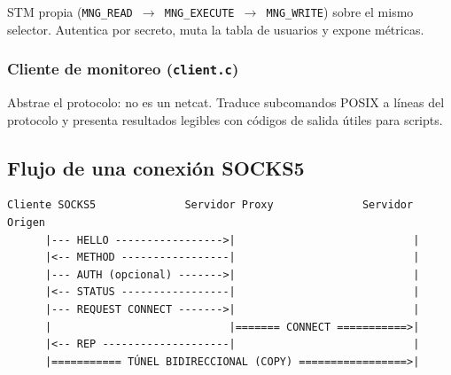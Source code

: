 \documentclass[12pt,a4paper]{article}
\begin{document}
STM propia (\texttt{MNG\_READ $\rightarrow$ MNG\_EXECUTE $\rightarrow$ MNG\_WRITE})
sobre el mismo selector. Autentica por secreto, muta la tabla de usuarios y expone
métricas.

\subsubsection{Cliente de monitoreo (\texttt{client.c})}

Abstrae el protocolo: no es un netcat. Traduce subcomandos POSIX a líneas del
protocolo y presenta resultados legibles con códigos de salida útiles para scripts.

\subsection{Flujo de una conexión SOCKS5}

\begin{verbatim}
Cliente SOCKS5              Servidor Proxy              Servidor Origen
      |--- HELLO ----------------->|                            |
      |<-- METHOD -----------------|                            |
      |--- AUTH (opcional) ------->|                            |
      |<-- STATUS -----------------|                            |
      |--- REQUEST CONNECT ------->|                            |
      |                            |======= CONNECT ===========>|
      |<-- REP --------------------|                            |
      |=========== TÚNEL BIDIRECCIONAL (COPY) =================>|
\end{verbatim}
\end{document}
